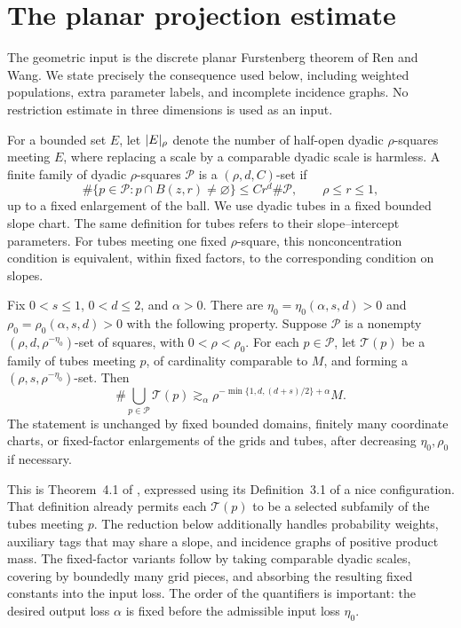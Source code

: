 \section{The planar projection estimate}
\label{sec:projection}

The geometric input is the discrete planar Furstenberg theorem of
Ren and Wang. We state precisely the consequence used below, including
weighted populations, extra parameter labels, and incomplete incidence
graphs. No restriction estimate in three dimensions is used as an input.

For a bounded set \(E\), let \(\lvert E\rvert_\rho\) denote the number of
half-open dyadic \(\rho\)-squares meeting \(E\), where replacing a scale
by a comparable dyadic scale is harmless. A finite family of dyadic
\(\rho\)-squares \(\mathcal P\) is a \((\rho,d,C)\)-set if
\[
 \#\{p\in\mathcal P:p\cap B(z,r)\ne\varnothing\}
 \le C r^d\#\mathcal P,\qquad \rho\le r\le1,
\]
up to a fixed enlargement of the ball. We use dyadic tubes in a fixed
bounded slope chart. The same definition for tubes refers to their
slope--intercept parameters. For tubes meeting one fixed
\(\rho\)-square, this nonconcentration condition is equivalent, within
fixed factors, to the corresponding condition on slopes.

\begin{theorem}
\label{thm:ren-wang}
Fix \(0<s\le1\), \(0<d\le2\), and \(\alpha>0\).
There are \(\eta_0=\eta_0(\alpha,s,d)>0\) and
\(\rho_0=\rho_0(\alpha,s,d)>0\) with the following property.
Suppose \(\mathcal P\) is a nonempty
\((\rho,d,\rho^{-\eta_0})\)-set of squares, with
\(0<\rho<\rho_0\). For each \(p\in\mathcal P\), let
\(\mathcal T(p)\) be a family of tubes meeting \(p\), of cardinality
comparable to \(M\), and forming a
\((\rho,s,\rho^{-\eta_0})\)-set. Then
\begin{equation}
 \#\bigcup_{p\in\mathcal P}\mathcal T(p)
 \gtrsim_\alpha
 \rho^{-\min\{1,d,(d+s)/2\}+\alpha}M .
 \label{eq:ren-wang-discrete}
\end{equation}
The statement is unchanged by fixed bounded domains, finitely many
coordinate charts, or fixed-factor enlargements of the grids and tubes,
after decreasing \(\eta_0,\rho_0\) if necessary.
\end{theorem}

This is Theorem~4.1 of \citet{RenWang2025}, expressed using its
Definition~3.1 of a nice configuration. That definition already permits
each $\mathcal T(p)$ to be a selected subfamily of the tubes meeting $p$.
The reduction below additionally handles probability weights, auxiliary
tags that may share a slope, and incidence graphs of positive product
mass. The fixed-factor variants follow by taking comparable dyadic scales,
covering by boundedly many grid
pieces, and absorbing the resulting fixed constants into the input
loss. The order of the quantifiers is important: the desired output
loss \(\alpha\) is fixed before the admissible input loss \(\eta_0\).

